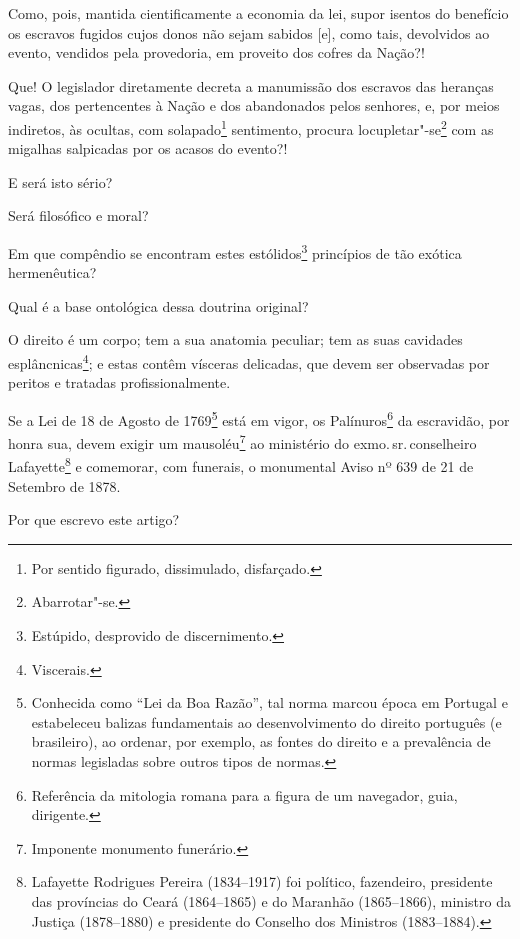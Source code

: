 Como, pois, mantida cientificamente a economia da lei, supor isentos do
benefício os escravos fugidos cujos donos não sejam sabidos {[}e{]},
como tais, devolvidos ao evento, vendidos pela provedoria, em proveito
dos cofres da Nação?!

Que! O legislador diretamente decreta a manumissão dos escravos das
heranças vagas, dos pertencentes à Nação e dos abandonados pelos
senhores, e, por meios indiretos, às ocultas, com solapado\footnote{
  Por sentido figurado, dissimulado, disfarçado.} sentimento, procura
locupletar"-se\footnote{Abarrotar"-se.} com as migalhas salpicadas por
os acasos do evento?!

E será isto sério?

Será filosófico e moral?

Em que compêndio se encontram estes estólidos\footnote{Estúpido,
  desprovido de discernimento.} princípios de tão exótica hermenêutica?

Qual é a base ontológica dessa doutrina original?

O direito é um corpo; tem a sua anatomia peculiar; tem as suas cavidades
esplâncnicas\footnote{Viscerais.}; e estas contêm vísceras delicadas,
que devem ser observadas por peritos e tratadas profissionalmente.

Se a Lei de 18 de Agosto de 1769\footnote{Conhecida como ``Lei da Boa
  Razão'', tal norma marcou época em Portugal e estabeleceu balizas
  fundamentais ao desenvolvimento do direito português (e brasileiro),
  ao ordenar, por exemplo, as fontes do direito e a prevalência de
  normas legisladas sobre outros tipos de normas.} está em vigor, os
Palínuros\footnote{Referência da mitologia romana para a figura de um
  navegador, guia, dirigente.} da escravidão, por honra sua, devem
exigir um mausoléu\footnote{Imponente monumento funerário.} ao
ministério do exmo.\,sr.\,conselheiro Lafayette\footnote{Lafayette
  Rodrigues Pereira (1834--1917) foi político, fazendeiro, presidente
  das províncias do Ceará (1864--1865) e do Maranhão (1865--1866),
  ministro da Justiça (1878--1880) e presidente do Conselho dos Ministros
  (1883--1884).} e comemorar, com funerais, o monumental Aviso nº 639 de
21 de Setembro de 1878.

\asterisc

Por que escrevo este artigo?

